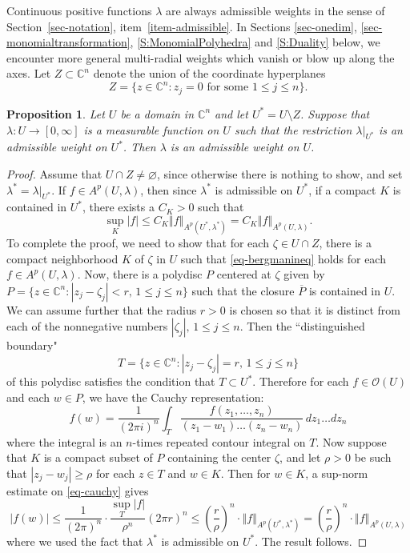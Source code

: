 \documentclass[letterpaper,11pt,reqno]{amsart}
\theoremstyle{plain}
\newtheorem{proposition}[equation]{Proposition}
\theoremstyle{definition}
\theoremstyle{remark}
\theoremstyle{remark}
\numberwithin{equation}{section}
\newcommand{\abs}[1]{\left\vert#1\right\vert}
\newcommand{\norm}[1]{\left\Vert#1\right\Vert}
\newcommand{\ol}{\overline}
\newcommand{\cx}{{\mathbb C}}
\begin{document}
Continuous positive functions $\lambda$ are always admissible weights in the sense of Section~\ref{sec-notation}, item~\eqref{item-admissible}. 
In Sections \ref{sec-onedim}, \ref{sec-monomialtransformation}, \ref{S:MonomialPolyhedra} and \ref{S:Duality} below, we encounter more general multi-radial weights which vanish or blow up along the axes.
Let $Z\subset\cx^n$ denote the union of the coordinate hyperplanes
\[ 
Z=\{z\in \cx^n:  z_j=0 \text{ for some  } 1\leq j \leq n\}.
\]
\begin{proposition}\label{prop-admissible}
    Let $U$ be a  domain in $\cx^n$ and let $U^*=U\setminus Z$. Suppose that $\lambda:U\to [0,\infty]$
    is a measurable function on $U$ such that the restriction $\lambda|_{U^*}$ is an admissible weight on $U^*$. Then 
    $\lambda$ is an admissible weight on $U$.
\end{proposition}
\begin{proof} Assume that  $U\cap Z\not=\varnothing$, since otherwise there is nothing to show,  and set $\lambda^*=\lambda|_{U^*}$. If $f\in A^p(U, \lambda)$, then since $\lambda^*$ is admissible on
$U^*$, if a compact $K$ is contained in $U^*$, there exists a $C_K>0$ such that 
\[
\sup_K \abs{f}\leq C_K \norm{f}_{A^p(U^*, \lambda^*)}=C_K \norm{f}_{A^p(U, \lambda)}.
\]
To complete the proof, we need to show that for each $\zeta\in U\cap Z$, there is a compact neighborhood $K$ of 
$\zeta$ in $U$ such that \eqref{eq-bergmanineq} holds for each $f\in A^p(U, \lambda)$. 
Now, there is a polydisc $P$ centered at $\zeta$ given by
$P=\{z\in \cx^n: \abs{z_j-\zeta_j}< r,\, 1 \leq j \leq n\}$
such that the closure $\ol{P}$ is contained in $U$. We can assume further  that the radius $r>0$ is chosen so that it is distinct from each of the nonnegative numbers $\abs{\zeta_j},\, 1\leq j \leq n$. Then the ``distinguished boundary"
\[
T=\{z\in \cx^n: \abs{z_j-\zeta_j} =r,\, 1\leq j \leq n \}
\]
of this polydisc satisfies the condition that $T\subset U^*$. 
Therefore for each $f\in \mathcal{O}(U)$ and each $w\in P$, we have the Cauchy representation:
\begin{equation}\label{eq-cauchy}
    f(w)= \frac{1}{(2\pi i)^n}\int_T \frac{f(z_1,\dots,z_n)}{(z_1-w_1)\dots (z_n-w_n)} \, dz_1\dots dz_n
\end{equation}    
where the integral is an $n$-times repeated contour integral on $T$. 
Now suppose that $K$ is a compact subset of $P$ containing the center $\zeta$, and let $\rho>0$ be such that $\abs{z_j-w_j}\geq \rho$ for each $z\in T$ and  
$w\in K$. 
Then for $w\in K$, a sup-norm estimate on \eqref{eq-cauchy} gives
\[
\abs{f(w)} \leq \frac{1}{(2\pi)^n}\cdot \frac{\sup_T\abs{f}}{\rho^n}(2\pi r)^n\leq \left(\frac{r}{\rho} \right)^n \cdot \norm{f}_{A^p(U^*,\lambda^*)} = \left(\frac{r}{\rho} \right)^n \cdot \norm{f}_{A^p(U,\lambda)}
\]
where we used the fact that $\lambda^*$ is admissible on $U^*$. The result follows.
\end{proof}
\end{document}
